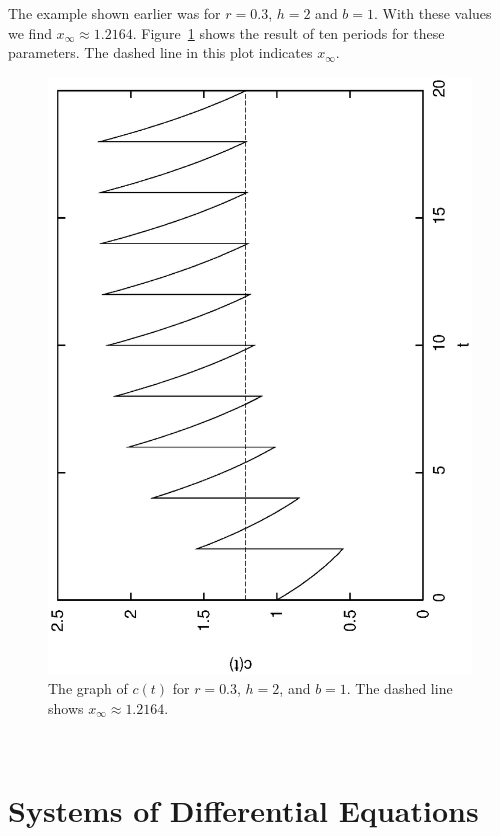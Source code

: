 \documentclass[reqno]{immbook}
\numberwithin{equation}{chapter}
\numberwithin{question}{section}
\numberwithin{theorem}{chapter}
\numberwithin{figure}{chapter}
\theoremstyle{definition}
\begin{document}
The example shown earlier was for $r=0.3$, $h=2$ and $b=1$.
With these values we find $x_{\infty} \approx 1.2164$.
Figure~\ref{fig:PeriodicDrugDosePlotWithXinf}
shows the result of ten periods for these parameters.
The dashed line in this plot indicates $x_{\infty}$.
\begin{figure}
\centerline{%
\includegraphics[angle=270,width=4.5in]{python_PeriodicDrugDose/PeriodicDrugDosePlotWithXinf.eps}
}
\caption{The graph of $c(t)$ for $r=0.3$, $h=2$, and $b=1$.
The dashed line shows $x_{\infty} \approx 1.2164$.}
\label{fig:PeriodicDrugDosePlotWithXinf}
\end{figure}
%

\newpage

~

\newpage

\section{Systems of Differential Equations}
\end{document}
